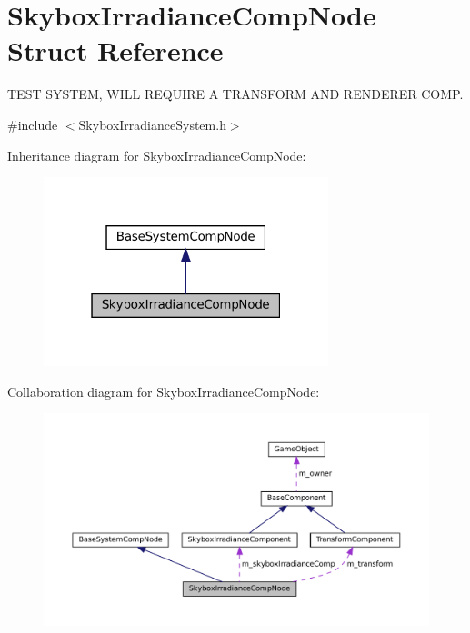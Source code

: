 \hypertarget{structSkyboxIrradianceCompNode}{}\section{Skybox\+Irradiance\+Comp\+Node Struct Reference}
\label{structSkyboxIrradianceCompNode}


T\+E\+ST S\+Y\+S\+T\+EM, W\+I\+LL R\+E\+Q\+U\+I\+RE A T\+R\+A\+N\+S\+F\+O\+RM A\+ND R\+E\+N\+D\+E\+R\+ER C\+O\+MP.  




{\ttfamily \#include $<$Skybox\+Irradiance\+System.\+h$>$}



Inheritance diagram for Skybox\+Irradiance\+Comp\+Node\+:\nopagebreak
\begin{figure}[H]
\begin{center}
\leavevmode
\includegraphics[width=235pt]{structSkyboxIrradianceCompNode__inherit__graph}
\end{center}
\end{figure}


Collaboration diagram for Skybox\+Irradiance\+Comp\+Node\+:\nopagebreak
\begin{figure}[H]
\begin{center}
\leavevmode
\includegraphics[width=350pt]{structSkyboxIrradianceCompNode__coll__graph}
\end{center}
\end{figure}
